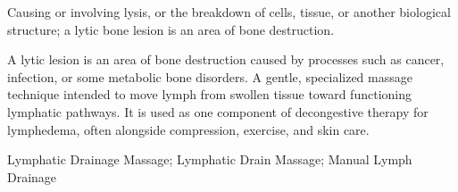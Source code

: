  Causing or involving lysis, or the breakdown of cells, tissue, or another biological structure; a lytic bone lesion is an area of bone destruction.

 A lytic lesion is an area of bone destruction caused by processes such as cancer, infection, or some metabolic bone disorders.
 A gentle, specialized massage technique intended to move lymph from swollen tissue toward functioning lymphatic pathways. It is used as one component of decongestive therapy for lymphedema, often alongside compression, exercise, and skin care.

\synonyms
Lymphatic Drainage Massage; Lymphatic Drain Massage; Manual Lymph Drainage
